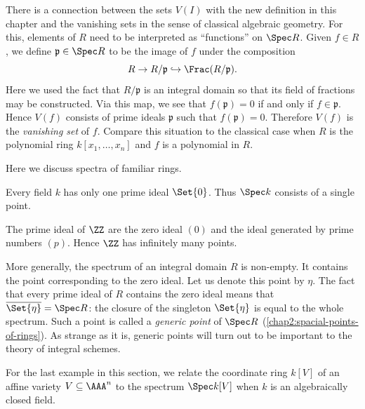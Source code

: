 There is a connection between the sets $V(I)$ with the new definition in this chapter and the vanishing sets in the sense of classical algebraic geometry. For this, elements of $R$ need to be interpreted as ``functions'' on $\Spec R$. Given $f \in R$, we define  $\mathfrak{p} \in \Spec R$ to be the image of $f$ under the composition
\begin{equation*}
	R \to R/\mathfrak{p} \hookrightarrow \Frac(R/\mathfrak{p}).
\end{equation*}
Here we used the fact that $R/\mathfrak{p}$ is an integral domain so that its field of fractions may be constructed. Via this map, we see that $f(\mathfrak{p}) = 0$ if and only if $f \in \mathfrak{p}$. Hence $V(f)$ consists of prime ideals $\mathfrak{p}$ such that $f(\mathfrak{p}) = 0$. Therefore $V(f)$ is the \textit{vanishing set} of $f$. Compare this situation to the classical case when $R$ is the polynomial ring $k[x_1, \dotsc, x_n]$ and $f$ is a polynomial in $R$.

Here we discuss spectra of familiar rings.

\begin{example}
	Every field $k$ has only one prime ideal $\Set{0}$. Thus $\Spec k$ consists of a single point.
\end{example}

\begin{example}[Spectrum of $\ZZ$]
	The prime ideal of $\ZZ$ are the zero ideal $(0)$ and the ideal generated by prime numbers $(p)$. Hence $\ZZ$ has infinitely many points.
\end{example}

More generally, the spectrum of an integral domain $R$ is non-empty. It contains the point corresponding to the zero ideal. Let us denote this point by $\eta$. The fact that every prime ideal of $R$ contains the zero ideal means that $\overline{\Set{\eta}} = \Spec R$: the closure of the singleton $\Set{\eta}$ is equal to the whole spectrum. Such a point is called a \textit{generic point} of $\Spec R$ (\cref{chap2:spacial-points-of-rings}). As strange as it is, generic points will turn out to be important to the theory of integral schemes.





For the last example in this section, we relate the coordinate ring $k[V]$ of an affine variety $V \subseteq \AAA^n$ to the spectrum $\Spec k[V]$ when $k$ is an algebraically closed field.

